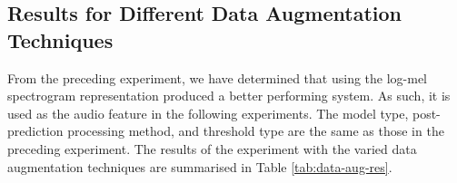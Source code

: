 \subsection{Results for Different Data Augmentation Techniques}
From the preceding experiment, we have determined that using the log-mel spectrogram representation produced a better performing system. As such, it is used as the audio feature in the following experiments. The model type, post-prediction processing method, and threshold type are the same as those in the preceding experiment. The results of the experiment with the varied data augmentation techniques are summarised in Table \ref{tab:data-aug-res}.\\

\begin{table}[!htp]
\centering
{}
\end{table}
